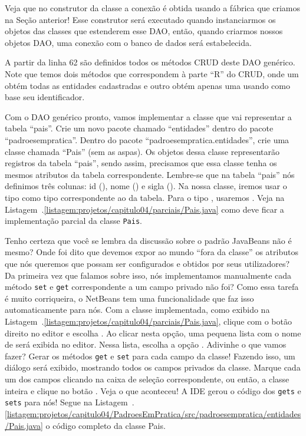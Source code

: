 Veja que no construtor da classe a conexão é obtida usando a fábrica que criamos na Seção anterior! Esse construtor será executado quando instanciarmos os objetos das classes que estenderem esse DAO, então, quando criarmos nossos objetos DAO, uma conexão com o banco de dados será estabelecida.

A partir da linha 62 são definidos todos os métodos CRUD deste DAO genérico. Note que temos dois métodos que correspondem à parte ``R'' do CRUD, onde um obtém todas as entidades cadastradas e outro obtém apenas uma usando como base seu identificador.

Com o DAO genérico pronto, vamos implementar a classe que vai representar a tabela ``pais''. Crie um novo pacote chamado ``entidades'' dentro do pacote ``padroesempratica''. Dentro do pacote ``padroesempratica.entidades'', crie uma classe chamada ``Pais'' (sem as aspas). Os objetos dessa classe representarão registros da tabela ``pais'', sendo assim, precisamos que essa classe tenha os mesmos atributos da tabela correspondente. Lembre-se que na tabela ``pais'' nós definimos três colunas: id (), nome () e sigla (). Na nossa classe, iremos usar o tipo  como tipo correspondente ao  da tabela. Para o tipo , usaremos . Veja na Listagem~\thechapter.\ref{listagem:projetos/capitulo04/parciais/Pais.java} como deve ficar a implementação parcial da classe \texttt{Pais}.


Tenho certeza que você se lembra da discussão sobre o padrão JavaBeans não é mesmo? Onde foi dito que devemos expor ao mundo ``fora da classe'' os atributos que nós queremos que possam ser configurados e obtidos por seus utilizadores? Da primeira vez que falamos sobre isso, nós implementamos manualmente cada método \texttt{set} e \texttt{get} correspondente a um campo privado não foi? Como essa tarefa é muito corriqueira, o NetBeans tem uma funcionalidade que faz isso automaticamente para nós. Com a classe implementada, como exibido na Listagem~\thechapter.\ref{listagem:projetos/capitulo04/parciais/Pais.java}, clique com o botão direito no editor e escolha . Ao clicar nesta opção, uma pequena lista com o nome de  será exibida no editor. Nessa lista, escolha a opção . Adivinhe o que vamos fazer? Gerar os métodos \texttt{get} e \texttt{set} para cada campo da classe! Fazendo isso, um diálogo será exibido, mostrando todos os campos privados da classe. Marque cada um dos campos clicando na caixa de seleção correspondente, ou então, a classe inteira e clique no botão . Veja o que aconteceu! A IDE gerou o código dos \texttt{gets} e \texttt{sets} para nós! Segue na Listagem~\thechapter.\ref{listagem:projetos/capitulo04/PadroesEmPratica/src/padroesempratica/entidades/Pais.java} o código completo da classe Pais.

